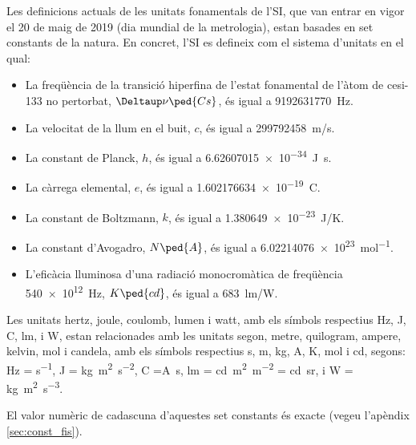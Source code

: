 Les definicions actuals de les unitats fonamentals de l'SI, que van entrar en vigor el 20 de maig de 2019 (dia mundial de la metrologia), estan basades en set constants de la natura. En concret, l'SI es defineix com el  sistema d'unitats en el qual:
\begin{itemize}

\item La freqüència de la transició hiperfina de l'estat fonamental de l'àtom de cesi-133 no pertorbat, $\Deltaup\nu\ped{Cs}$, és igual a \qty{9 192 631 770}{Hz}.
\item La velocitat de la llum en el buit, $c$, és igual a \qty{299792458}{m/s}.
\item La constant de Planck, $h$, és igual a \qty{6,62607015 e-34}{J.s}.
\item La càrrega elemental, $e$, és igual a \qty{1,602176634 e-19}{C}.
\item La constant de Boltzmann, $k$, és igual a \qty{1,380649e-23}{J/K}.
\item La constant d'Avogadro, $N\ped{A}$, és igual a \qty{6,02214076 e23}{mol^{-1}}.
\item L'eficàcia lluminosa d'una radiació monocromàtica de freqüència \qty{540e12}{Hz},  $K\ped{cd}$, és igual a \qty{683}{lm/W}.
\end{itemize}


Les unitats  hertz, joule, coulomb, lumen i watt, amb els símbols respectius Hz, J, C, lm, i W, estan relacionades amb les unitats segon, metre, quilogram, ampere, kelvin, mol i candela, amb els símbols respectius s, m, kg, A, K, mol i cd, segons:  Hz = \unit{s^{-1}}, J = \unit{kg.m^2.s^{-2}}, C =\unit{A.s}, lm = \unit{cd.m^2.m^{-2}} = \unit{cd.sr}, i W = \unit{kg.m^2.s^{-3}}.

El valor numèric de cadascuna d'aquestes set constants és exacte (vegeu l'apèndix \vref{sec:const_fis}).

